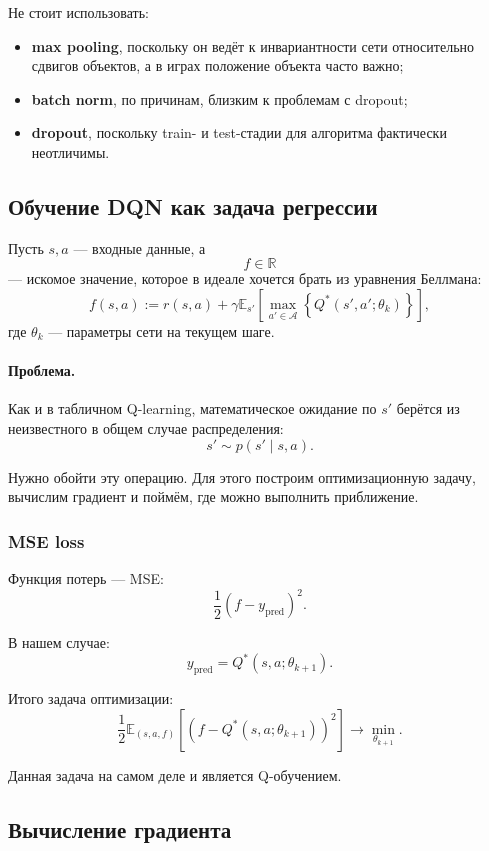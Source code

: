 \documentclass[12pt,a4paper]{article}
\begin{document}
Не стоит использовать:
\begin{itemize}
    \item \textbf{max pooling}, поскольку он ведёт к инвариантности сети относительно сдвигов объектов, а в играх положение объекта часто важно;
    \item \textbf{batch norm}, по причинам, близким к проблемам с dropout;
    \item \textbf{dropout}, поскольку train- и test-стадии для алгоритма фактически неотличимы.
\end{itemize}

\subsection{Обучение DQN как задача регрессии}

Пусть $s,a$ --- входные данные, а
\[
f \in \mathbb R
\]
--- искомое значение, которое в идеале хочется брать из уравнения Беллмана:
\[
f(s,a)
:=
r(s,a)
+
\gamma
\mathbb E_{s'}
\left[
\max_{a' \in \mathcal A}
\left\{
Q^\ast(s',a';\theta_k)
\right\}
\right],
\]
где $\theta_k$ --- параметры сети на текущем шаге.

\paragraph{Проблема.}

Как и в табличном Q-learning, математическое ожидание по $s'$ берётся из неизвестного в общем случае распределения:
\[
s' \sim p(s'\mid s,a).
\]

Нужно обойти эту операцию. Для этого построим оптимизационную задачу, вычислим градиент и поймём, где можно выполнить приближение.

\subsubsection{MSE loss}

Функция потерь --- MSE:
\[
\frac{1}{2}
\left(
f-y_{\mathrm{pred}}
\right)^2.
\]

В нашем случае:
\[
y_{\mathrm{pred}}
=
Q^\ast(s,a;\theta_{k+1}).
\]

Итого задача оптимизации:
\[
\frac{1}{2}
\mathbb E_{(s,a,f)}
\left[
\left(
f
-
Q^\ast(s,a;\theta_{k+1})
\right)^2
\right]
\to
\min_{\theta_{k+1}}.
\]

Данная задача на самом деле и является Q-обучением.

\subsection{Вычисление градиента}
\end{document}
